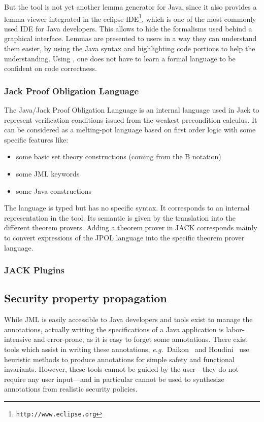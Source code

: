  But the tool is not yet another lemma generator for Java, since it
 also provides a lemma viewer integrated in the eclipse
 IDE\footnote{\texttt{http://www.eclipse.org}}, which is one of the
 most commonly used IDE for Java developers.  This allows to hide the
 formalisms used behind a graphical interface.  Lemmas are presented
 to users in a way they can understand them easier, by using the Java
 syntax and highlighting code portions to help the
 understanding. Using \JACK, one does not have to learn a formal
 language to be confident on code correctness.

\subsubsection{Jack Proof Obligation Language}
 \label{JPOL}
The Java/Jack Proof Obligation Language is an internal language used in Jack to represent verification conditions issued from the weakest precondition calculus. It can be considered as a melting-pot language based on first order logic with some specific features like:
\begin{itemize}
\item some basic set theory constructions (coming from the B notation)
\item some JML keywords
\item some Java constructions
\end{itemize}
The language is typed but has no specific syntax. It corresponds to an internal representation in the tool. Its semantic is given by the translation into the different theorem provers. Adding a theorem prover in JACK corresponds mainly to convert expressions of the JPOL language into the specific theorem prover language.

\subsubsection{JACK Plugins}

\subsection{Security property propagation}\label{sec:highlevel}

While JML is easily accessible to Java developers and tools exist
to manage the annotations, actually writing
the specifications of a Java application is labor-intensive and
error-prone, as it is easy to forget some annotations. There
exist tools which assist in writing these annotations,
\emph{e.g.}~Daikon~\cite{ErnstCGN2001:TSE} and Houdini~\cite{FlanaganL01}
use heuristic methods to produce annotations for simple safety and
functional invariants.  However, these tools cannot be guided by the
user---they do not require any user input---and in particular cannot
be used to synthesize annotations from realistic security policies.

